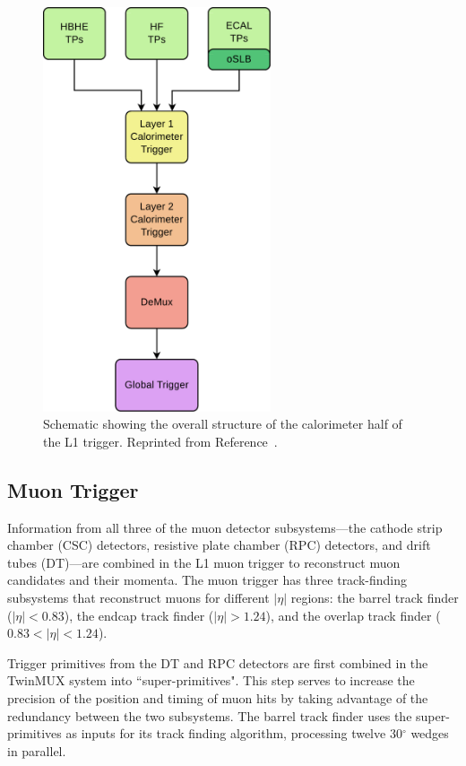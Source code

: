 \begin{figure}[h]
\begin{center}
\includegraphics[width=0.6\textwidth]{Figures/Trigger/caloL1T.pdf}
\end{center}
\caption{Schematic showing the overall structure of the calorimeter half of the L1 trigger. Reprinted from Reference~\cite{L1twiki}.}
\label{fig:caloL1T}
\end{figure}


\subsection{Muon Trigger}
Information from all three of the muon detector subsystems---the cathode strip chamber (CSC) detectors, resistive plate chamber (RPC) detectors, and drift tubes (DT)---are combined in the L1 muon trigger to reconstruct muon candidates and their momenta. The muon trigger has three track-finding subsystems that reconstruct muons for different $|\eta|$ regions: the barrel track finder ($|\eta| < 0.83$), the endcap track finder ($|\eta| > 1.24$), and the overlap track finder ($0.83 < |\eta| < 1.24$).

Trigger primitives from the DT and RPC detectors are first combined in the TwinMUX system into ``super-primitives". This step serves to increase the precision of the position and timing of muon hits by taking advantage of the redundancy between the two subsystems.  The barrel track finder uses the super-primitives as inputs for its track finding algorithm, processing twelve 30$^{\circ}$ wedges in parallel. 

